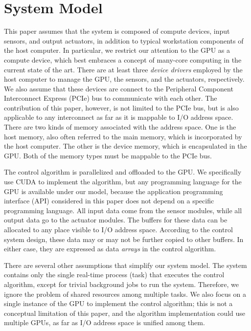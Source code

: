 \section{System Model}
\label{sec:system_model}

This paper assumes that the system is composed of compute devices, input
sensors, and output actuators, in addition to typical workstation
components of the host computer.
In particular, we restrict our attention to the GPU as a compute device,
which best embraces a concept of many-core computing in the current
state of the art.
There are at least three \textit{device drivers} employed by the host
computer to manage the GPU, the sensors, and the actuators,
respectively.
We also assume that these devices are connect to the Peripheral
Component Interconnect Express (PCIe) bus to communicate with each
other.
The contribution of this paper, however, is not limited to the PCIe bus,
but is also applicable to any interconnect as far as it is mappable to
I/O address space.
There are two kinds of memory associated with the address space.
One is the host memory, also often referred to the main memory, which is
incorporated by the host computer.
The other is the device memory, which is encapsulated in the GPU.
Both of the memory types must be mappable to the PCIe bus.

The control algorithm is parallelized and offloaded to the GPU.
We specifically use CUDA to implement the algorithm, but any programming
language for the GPU is available under our model, because the
application programming interface (API) considered in this paper does
not depend on a specific programming language.
All input data come from the sensor modules, while all output data go to
the actuator modules.
The buffers for these data can be allocated to any place visible to I/O
address space.
According to the control system design, these data may or may not be
further copied to other buffers.
In either case, they are expressed as data \textit{arrays} in the
control algorithm.

There are several other assumptions that simplify our system model.
The system contains only the single real-time process (task) that
executes the control algorithm, except for trivial background jobs to
run the system.
Therefore, we ignore the problem of shared resources among multiple
tasks.
We also focus on a single instance of the GPU to implement the control
algorithm; this is not a conceptual limitation of this paper, and the
algorithm implementation could use multiple GPUs, as far as I/O address
space is unified among them.